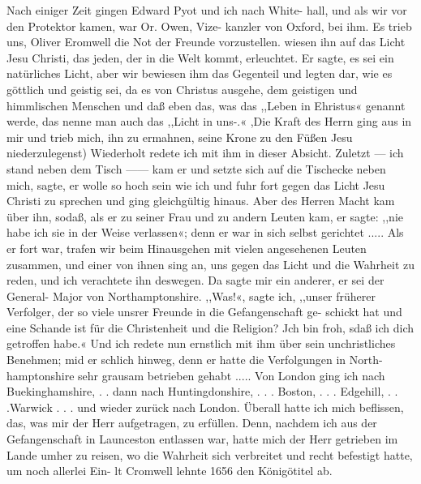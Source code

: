 Nach einiger Zeit gingen Edward Pyot und ich nach White-
hall, und als wir vor den Protektor kamen, war Or. Owen, Vize-
kanzler von Oxford, bei ihm. Es trieb uns, Oliver Eromwell die
Not der Freunde vorzustellen.   wiesen ihn auf das Licht
Jesu Christi, das jeden, der in die Welt kommt, erleuchtet.
Er sagte, es sei ein natürliches Licht, aber wir bewiesen ihm das
Gegenteil und legten dar, wie es göttlich und geistig sei, da es
von Christus ausgehe, dem geistigen und himmlischen Menschen
und daß eben das, was das ,,Leben in Ehristus« genannt werde,
das nenne man auch das ,,Licht in uns-.« ,Die Kraft des Herrn
ging aus in mir und trieb mich, ihn zu ermahnen, seine Krone
zu den Füßen Jesu niederzulegenst) Wiederholt redete ich mit
ihm in dieser Absicht. Zuletzt — ich stand neben dem Tisch ——
kam er und setzte sich auf die Tischecke neben mich, sagte, er wolle
so hoch sein wie ich und fuhr fort gegen das Licht Jesu Christi
zu sprechen und ging gleichgültig hinaus. Aber des Herren Macht
kam über ihn, sodaß, als er zu seiner Frau und zu andern
Leuten kam, er sagte: ,,nie habe ich sie in der Weise verlassen«;
denn er war in sich selbst gerichtet .....
Als er fort war, trafen wir beim Hinausgehen mit vielen
angesehenen Leuten zusammen, und einer von ihnen sing an, uns
gegen das Licht und die Wahrheit zu reden, und ich verachtete
ihn deswegen. Da sagte mir ein anderer, er sei der General-
Major von Northamptonshire. ,,Was!«, sagte ich, ,,unser früherer
Verfolger, der so viele unsrer Freunde in die Gefangenschaft ge-
schickt hat und eine Schande ist für die Christenheit und die
Religion? Jch bin froh, sdaß ich dich getroffen habe.« Und ich
redete nun ernstlich mit ihm über sein unchristliches Benehmen;
mid er schlich hinweg, denn er hatte die Verfolgungen in North-
hamptonshire sehr grausam betrieben gehabt .....
Von London ging ich nach Buekinghamshire, . . dann nach
Huntingdonshire, . . . Boston, . . . Edgehill, . . .Warwick . . .
und wieder zurück nach London. Überall hatte ich mich beflissen,
das, was mir der Herr aufgetragen, zu erfüllen. Denn, nachdem
ich aus der Gefangenschaft in Launceston entlassen war, hatte mich
der Herr getrieben im Lande umher zu reisen, wo die Wahrheit
sich verbreitet und recht befestigt hatte, um noch allerlei Ein-
lt Cromwell lehnte 1656 den Königötitel ab.


